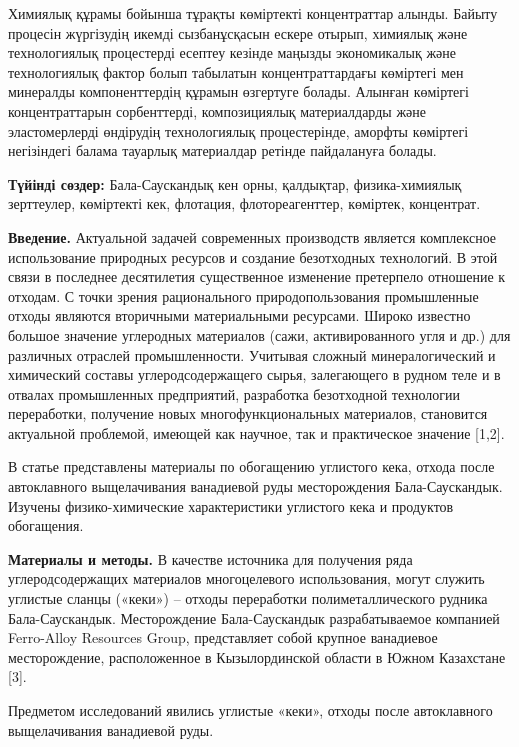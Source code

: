 Химиялық құрамы бойынша тұрақты көміртекті концентраттар алынды. Байыту
процесін жүргізудің икемді сызбанұсқасын ескере отырып, химиялық және
технологиялық процестерді есептеу кезінде маңызды экономикалық және
технологиялық фактор болып табылатын концентраттардағы көміртегі мен
минералды компоненттердің құрамын өзгертуге болады. Алынған көміртегі
концентраттарын сорбенттерді, композициялық материалдарды және
эластомерлерді өндірудің технологиялық процестерінде, аморфты көміртегі
негізіндегі балама тауарлық материалдар ретінде пайдалануға болады.

{\bfseries Түйінді сөздер:} Бала-Саускандық кен орны, қалдықтар,
физика-химиялық зерттеулер, көміртекті кек, флотация, флотореагенттер,
көміртек, концентрат.

\begin{multicols}{2}
{\bfseries Введение.} Актуальной задачей современных производств является
комплексное использование природных ресурсов и создание безотходных
технологий. В этой связи в последнее десятилетия существенное изменение
претерпело отношение к отходам. С точки зрения рационального
природопользования промышленные отходы являются вторичными материальными
ресурсами. Широко известно большое значение углеродных материалов (сажи,
активированного угля и др.) для различных отраслей промышленности.
Учитывая сложный минералогический и химический составы
углеродсодержащего сырья, залегающего в рудном теле и в отвалах
промышленных предприятий, разработка безотходной технологии переработки,
получение новых многофункциональных материалов, становится актуальной
проблемой, имеющей как научное, так и практическое значение {[}1,2{]}.

В статье представлены материалы по обогащению углистого кека, отхода
после автоклавного выщелачивания ванадиевой руды месторождения
Бала-Саускандык. Изучены физико-химические характеристики углистого кека
и продуктов обогащения.

{\bfseries Материалы и методы.} В качестве источника для получения ряда
углеродсодержащих материалов многоцелевого использования, могут служить
углистые сланцы («кеки») -- отходы переработки полиметаллического
рудника Бала-Саускандык. Месторождение Бала-Саускандык разрабатываемое
компанией Ferro-Alloy Resources Group, представляет собой крупное
ванадиевое месторождение, расположенное в Кызылординской области в Южном
Казахстане {[}3{]}.

Предметом исследований явились углистые «кеки», отходы после
автоклавного выщелачивания ванадиевой руды.


\end{multicols}

